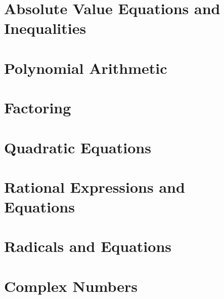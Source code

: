 \section{Absolute Value Equations and Inequalities}



\newpage

\section{Polynomial Arithmetic}



\newpage

\section{Factoring}



\newpage

\section{Quadratic Equations}



\newpage

\section{Rational Expressions and Equations}



\newpage

\section{Radicals and Equations}



\newpage

\section{Complex Numbers}



\newpage